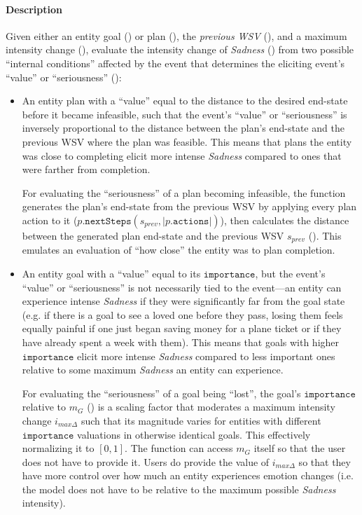 \paragraph{Description} Given either an entity goal () or plan
(), the \textit{previous WSV} (), and a
maximum intensity change (), evaluate the intensity
change of \textit{Sadness} () from two
possible ``internal conditions'' affected by the event that determines the
eliciting event's ``value'' or ``seriousness'' ():
\begin{itemize}

    \item An entity plan with a ``value'' equal to the distance to the desired
    end-state before it became infeasible, such that the event's ``value'' or
    ``seriousness'' is inversely proportional to the distance between the
    plan's end-state and the previous WSV where the plan was feasible. This
    means that plans the entity was close to completing elicit more intense
    \textit{Sadness} compared to ones that were farther from completion.

    For evaluating the ``seriousness'' of a plan becoming infeasible, the
    function generates the plan's end-state from the previous WSV by applying
    every plan action to it ($p.\mathtt{nextSteps}(s_{prev},
    |p.\mathtt{actions}|)$), then calculates the distance between the generated
    plan end-state and the previous WSV $s_{prev}$ ().
    This emulates an evaluation of ``how close'' the entity was to plan
    completion.

    \item An entity goal with a ``value'' equal to its $\mathtt{importance}$,
    but the event's ``value'' or ``seriousness'' is not necessarily tied to the
    event---an entity can experience intense \textit{Sadness} if they were
    significantly far from the goal state (e.g. if there is a goal to see a
    loved one before they pass, losing them feels equally painful if one just
    began saving money for a plane ticket or if they have already spent a week
    with them). This means that goals with higher $\mathtt{importance}$ elicit
    more intense \textit{Sadness} compared to less important ones relative to
    some maximum \textit{Sadness} an entity can experience.

    For evaluating the ``seriousness'' of a goal being ``lost'', the goal's
    $\mathtt{importance}$ relative to $m_G$
    () is a scaling factor that moderates a
    maximum intensity change $i_{\mathit{max}\Delta}$ such that its magnitude
    varies for entities with different $\mathtt{importance}$ valuations in
    otherwise identical goals. This effectively normalizing it to $[0,1]$. The
    function can access $m_G$ itself so that the user does not have to provide
    it. Users do provide the value of $i_{\mathit{max}\Delta}$ so that they
    have more control over how much an entity experiences emotion changes (i.e.
    the model does not have to be relative to the maximum possible
    \textit{Sadness} intensity).


\end{itemize}
